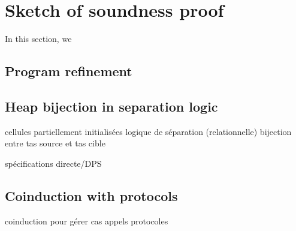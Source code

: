 \section{Sketch of soundness proof}
\label{sec:sketch}

In this section, we

\subsection{Program refinement}




\subsection{Heap bijection in separation logic}

cellules partiellement initialisées
logique de séparation (relationnelle)
bijection entre tas source et tas cible

spécifications directe/DPS




\subsection{Coinduction with protocols}

coinduction pour gérer cas appels
protocoles

